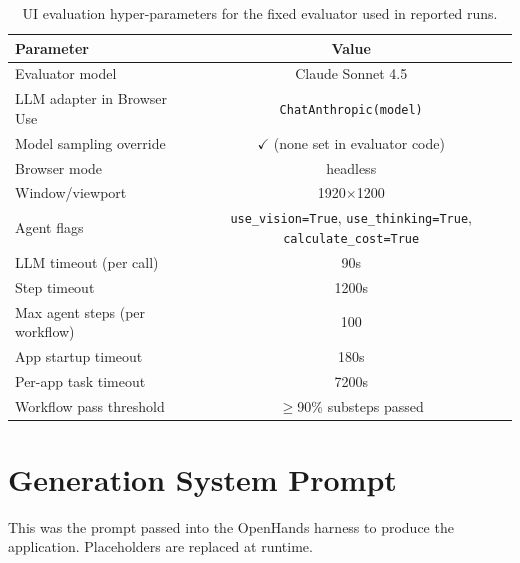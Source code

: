 \begin{table}[!h]
\caption{UI evaluation hyper-parameters for the fixed evaluator used in reported runs.}
\label{tab:ui_eval_hparams_sonnet45}
\small
\begin{tabular}{@{}p{6.0cm} c c c c c@{}}
\toprule
\textbf{Parameter} & \multicolumn{5}{c}{\textbf{Value}} \\
\midrule
Evaluator model & \multicolumn{5}{c}{Claude Sonnet 4.5} \\
LLM adapter in Browser Use & \multicolumn{5}{c}{\texttt{ChatAnthropic(model)}} \\
Model sampling override & \multicolumn{5}{c}{$\checkmark$ (none set in evaluator code)} \\
Browser mode & \multicolumn{5}{c}{headless} \\
Window/viewport & \multicolumn{5}{c}{1920$\times$1200} \\
Agent flags & \multicolumn{5}{c}{\texttt{use\_vision=True}, \texttt{use\_thinking=True}, \texttt{calculate\_cost=True}} \\
LLM timeout (per call) & \multicolumn{5}{c}{90s} \\
Step timeout & \multicolumn{5}{c}{1200s} \\
Max agent steps (per workflow) & \multicolumn{5}{c}{100} \\
App startup timeout & \multicolumn{5}{c}{180s} \\
Per-app task timeout & \multicolumn{5}{c}{7200s} \\
Workflow pass threshold & \multicolumn{5}{c}{$\geq$90\% substeps passed} \\
\bottomrule
\end{tabular}
\end{table}

\clearpage
\section{Generation System Prompt}
\label{sec:generation-prompt}
This was the prompt passed into the OpenHands harness to produce the application. Placeholders are replaced at runtime.


